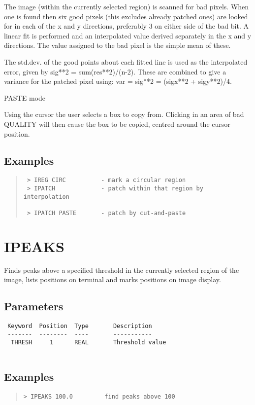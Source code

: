 \documentclass{book}
\renewcommand{\_}{{\tt\char'137}}     %
\begin{document}
The image (within the currently selected region) is scanned for bad
pixels. When one is found then six good pixels (this excludes already
patched ones) are looked for in each of the x and y directions,
preferably 3 on either side of the bad bit. A linear fit is performed
and an interpolated value derived separately in the x and y directions.
The value assigned to the bad pixel is the simple mean of these.
 
The std.dev. of the good points about each fitted line is used as
the interpolated error, given by sig**2 = sum(res**2)/(n-2). These
are combined to give a variance for the patched pixel using:
var = sig**2 = (sigx**2 + sigy**2)/4.
 
PASTE mode
 
Using the cursor the user selects a box to copy from. Clicking in
an area of bad QUALITY will then cause the box to be copied, centred
around the cursor position.
 
\subsection{Examples}
\begin{quote}\begin{verbatim}
 > IREG CIRC          - mark a circular region
 > IPATCH             - patch within that region by interpolation
 
 > IPATCH PASTE       - patch by cut-and-paste
 \end{verbatim}\end{quote}
\section{IPEAKS}
Finds peaks above a specified threshold in the currently selected
region of the image, lists positions on terminal and marks positions
on image display.
 
\subsection{Parameters}
\begin{verbatim}
 Keyword  Position  Type       Description
 -------  --------  ----       -----------
  THRESH     1      REAL       Threshold value
 
\end{verbatim}\subsection{Examples}
\begin{quote}\begin{verbatim}
> IPEAKS 100.0         find peaks above 100
\end{verbatim}\end{quote}
\end{document}
